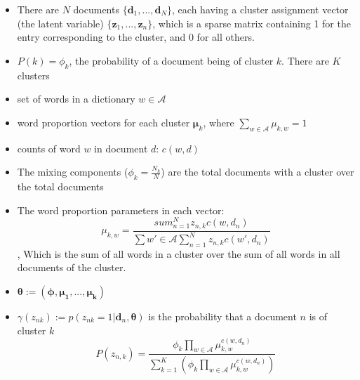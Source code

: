 \documentclass[a4paper]{article}
\begin{document}
	\begin{itemize}	
		\item There are $N$ documents $\{\mathbf{d}_1, ..., \mathbf{d}_N\}$, each having a cluster assignment vector (the latent variable) $\{\mathbf{z}_1, ..., \mathbf{z}_n\}$, which is a sparse matrix containing 1 for the entry corresponding to the cluster, and 0 for all others.
		\item $P(k) = \phi_k$, the probability of a document being of cluster $k$. There are $K$ clusters
		
		\item set of words in a dictionary $w \in \mathcal{A}$
		\item word proportion vectors for each cluster $\mathbf{\mu}_k$, where $\sum_{w \in \mathcal{A}} \mathcal{\mu}_{k,w} = 1$
		\item counts of word $w$ in document $d$: $c(w, d)$
		
		
		\item The mixing components ($\phi_k = \frac{N_k}{N}$) are the total documents with a cluster over the total documents
		
		\item The word proportion parameters in each vector: $$\mu_{k,w} = \frac {sum^N_{n=1}z_{n,k}c(w, d_n)} {\sum{w' \in \mathcal{A}} \sum^N_{n=1} z_{n,k}c(w', d_n)}$$,
		Which is the sum of all words in a cluster over the sum of all words in all documents of the cluster.
		
		\item $\mathbf{\theta} := (\mathbf{\phi}, \mathbf{\mu_1}, ..., \mathbf{\mu_k})$
		
		\item $\gamma(z_{nk}) := p(z_{nk} = 1 | \mathbf{d}_n, \mathbf{\theta})$ is the probability that a document $n$ is of cluster $k$ \\
		
		$$
		P(z_{n,k}) = \frac
		{\phi_k \prod_{w \in \mathcal{A}} \mu^{c(w, d_n)}_{k,w}}
		{\sum^K_{k=1}(\phi_k \prod_{w \in \mathcal{A}} \mu^{c(w, d_n)}_{k,w})} 
		$$
		
	\end{itemize}
	
\end{document}
